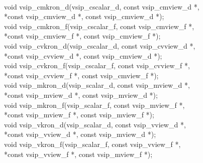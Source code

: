 \\\cvsiplh
\begin{cfuncs}
void vsip\_cmkron\_d(vsip\_cscalar\_d, const vsip\_cmview\_d *,\\*\hspace{.6cm}const vsip\_cmview\_d *, const vsip\_cmview\_d *);\\
void vsip\_cmkron\_f(vsip\_cscalar\_f, const vsip\_cmview\_f *,\\*\hspace{.6cm}const vsip\_cmview\_f *, const vsip\_cmview\_f *);\\
void vsip\_cvkron\_d(vsip\_cscalar\_d, const vsip\_cvview\_d *,\\*\hspace{.6cm}const vsip\_cvview\_d *, const vsip\_cmview\_d *);\\
void vsip\_cvkron\_f(vsip\_cscalar\_f, const vsip\_cvview\_f *,\\*\hspace{.6cm}const vsip\_cvview\_f *, const vsip\_cmview\_f *);\\
void vsip\_mkron\_d(vsip\_scalar\_d, const vsip\_mview\_d *,\\*\hspace{.6cm}const vsip\_mview\_d *, const vsip\_mview\_d *);\\
void vsip\_mkron\_f(vsip\_scalar\_f, const vsip\_mview\_f *,\\*\hspace{.6cm}const vsip\_mview\_f *, const vsip\_mview\_f *);\\
void vsip\_vkron\_d(vsip\_scalar\_d, const vsip\_vview\_d *,\\*\hspace{.6cm}const vsip\_vview\_d *, const vsip\_mview\_d *);\\
void vsip\_vkron\_f(vsip\_scalar\_f, const vsip\_vview\_f *,\\*\hspace{.6cm}const vsip\_vview\_f *, const vsip\_mview\_f *);\\
\end{cfuncs}
\pyjvsiph
{}

